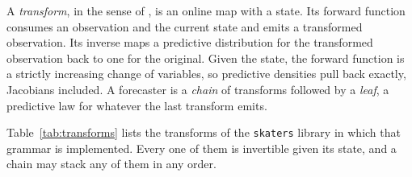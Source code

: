 \documentclass[11pt]{article}
\theoremstyle{remark}
\begin{document}
A \emph{transform}, in the sense of \citet{cotton2026transforms}, is an online map
with a state. Its forward function consumes an observation and the current state
and emits a transformed observation. Its inverse maps a predictive distribution for
the transformed observation back to one for the original. Given the state, the
forward function is a strictly increasing change of variables, so predictive
densities pull back exactly, Jacobians included. A forecaster is a \emph{chain} of
transforms followed by a \emph{leaf}, a predictive law for whatever the last transform emits.

Table~\ref{tab:transforms} lists the transforms of the
\texttt{skaters} library in which that grammar is implemented. Every one of them
is invertible given its state, and a chain may stack any of them in any order.
\end{document}
